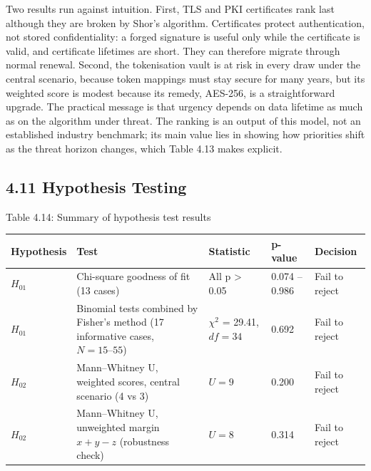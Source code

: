 \documentclass[12pt,oneside]{report}
\begin{document}
Two results run against intuition. First, TLS and PKI certificates rank last although they are broken by Shor's algorithm. Certificates protect authentication, not stored confidentiality: a forged signature is useful only while the certificate is valid, and certificate lifetimes are short. They can therefore migrate through normal renewal. Second, the tokenisation vault is at risk in every draw under the central scenario, because token mappings must stay secure for many years, but its weighted score is modest because its remedy, AES-256, is a straightforward upgrade. The practical message is that urgency depends on data lifetime as much as on the algorithm under threat. The ranking is an output of this model, not an established industry benchmark; its main value lies in showing how priorities shift as the threat horizon changes, which Table 4.13 makes explicit.
\par

\subsection*{4.11 Hypothesis Testing}

\label{tab:4.14}Table 4.14: Summary of hypothesis test results
\par

\begin{center}\small\begin{tabularx}{\textwidth}{|W|W|W|W|W|}\hline
Hypothesis & Test & Statistic & p-value & Decision \\\hline
$H_{01}$ & Chi-square goodness of fit (13 cases) & All p > 0.05 & 0.074 – 0.986 & Fail to reject \\\hline
$H_{01}$ & Binomial tests combined by Fisher's method (17 informative cases, $N = 15\text{--}55$) & $\chi^{2}$ = 29.41, $df = 34$ & 0.692 & Fail to reject \\\hline
$H_{02}$ & Mann–Whitney U, weighted scores, central scenario (4 vs 3) & $U = 9$ & 0.200 & Fail to reject \\\hline
$H_{02}$ & Mann–Whitney U, unweighted margin $x + y - z$ (robustness check) & $U = 8$ & 0.314 & Fail to reject \\\hline\end{tabularx}\end{center}
\end{document}
